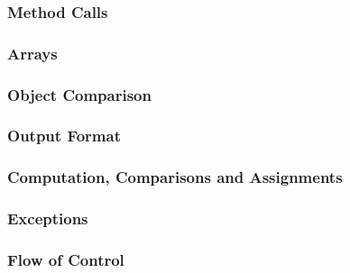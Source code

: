 \subsubsection{Method Calls}
\begin{itemize}
\end{itemize}

\subsubsection{Arrays}
\begin{itemize}
\end{itemize}

\subsubsection{Object Comparison}
\begin{itemize}
\end{itemize}

\subsubsection{Output Format}
\begin{itemize}
\end{itemize}

\subsubsection{Computation, Comparisons and Assignments}
\begin{itemize}
\end{itemize}

\subsubsection{Exceptions}
\begin{itemize}
\end{itemize}

\subsubsection{Flow of Control}
\begin{itemize}
\end{itemize}

